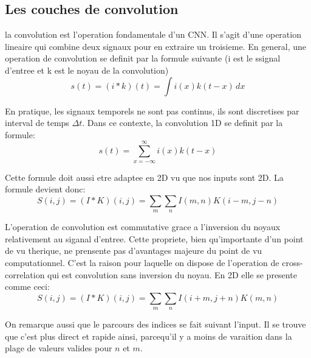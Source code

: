 \subsection{Les couches de convolution}
la convolution est l'operation fondamentale d'un CNN. Il s'agit d'une operation lineaire qui combine deux signaux pour en extraire un troisieme. En general, une operation de convolution se definit par la formule suivante (i est le ssignal d'entree et k est le noyau de la convolution)
$$ s(t) = (i * k)(t) = \int i(x)k(t-x) \, dx $$

En pratique, les signaux temporels ne sont pas continus, ils sont discretises par interval de temps $\Delta t$. Dans ce contexte, la convolution 1D se definit par la formule:
\begin{equation}
 s(t) = \sum_{x=-\infty}^{\infty} i(x)k(t-x)
 \label{eqn:Conv1D}
\end{equation}

Cette formule doit aussi etre adaptee en 2D vu que nos inputs sont 2D. La formule devient donc:
\begin{equation}
 S(i,j) = (I * K)(i,j) = \sum_{m}\sum_{n} I(m,n)K(i-m,j-n)
 \label{eqn:Conv2D}
\end{equation}

L'operation de convolution est commutative grace a l'inversion du noyaux relativement au siganal d'entree. Cette propriete, bien qu'importante d'un point de vu therique, ne prensente pas d'avantages majeure du point de vu computationnel. C'est la raison pour laquelle on dispose de l'operation de cross-correlation qui est convolution sans inversion du noyau. En 2D elle se presente comme ceci:
\begin{equation}
 S(i,j) = (I * K)(i,j) = \sum_{m}\sum_{n} I(i+m,j+n)K(m,n)
 \label{eqn:Corr2D}
\end{equation}

On remarque aussi que le parcours des indices se fait suivant l'input. Il se trouve que c'est plus direct et rapide ainsi, parcequ'il y a moins de varaition dans la plage de valeurs valides pour $n$ et $m$. 

